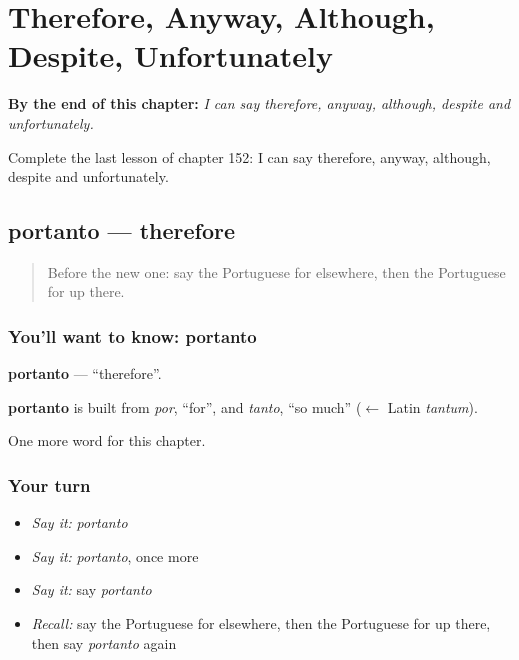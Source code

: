 
\chapter{Therefore, Anyway, Although, Despite, Unfortunately}
\label{ch:pt-therefore-anyway-although-despite-unfortunately}

\begin{chapteropening}
\textbf{By the end of this chapter:} \emph{I can say therefore, anyway, although, despite and unfortunately.}

Complete the last lesson of chapter 152: I can say therefore, anyway, although, despite and unfortunately.
\end{chapteropening}

\section[portanto]{portanto — therefore}

\label{lesson:PT-C152-portanto}



\begin{quote}
Before the new one: say the Portuguese for elsewhere, then the Portuguese for up there.
\end{quote}

\subsection*{You'll want to know: portanto}
\textbf{portanto} — \textquotedblleft{}therefore\textquotedblright{}.

\begin{cousinweb}
\textbf{portanto} is built from \emph{por}, \textquotedblleft{}for\textquotedblright{}, and \emph{tanto}, \textquotedblleft{}so much\textquotedblright{} ($\leftarrow$ Latin \emph{tantum}).
\end{cousinweb}

\begin{grammarlens}[title={What you've built}]
One more word for this chapter.
\end{grammarlens}

\subsection*{Your turn}
\begin{itemize}
\raggedright
  \item \emph{Say it:} \emph{portanto}
  \item \emph{Say it:} \emph{portanto}, once more
  \item \emph{Say it:} say \emph{portanto}
  \item \emph{Recall:} say the Portuguese for elsewhere, then the Portuguese for up there, then say \emph{portanto} again
\end{itemize}


